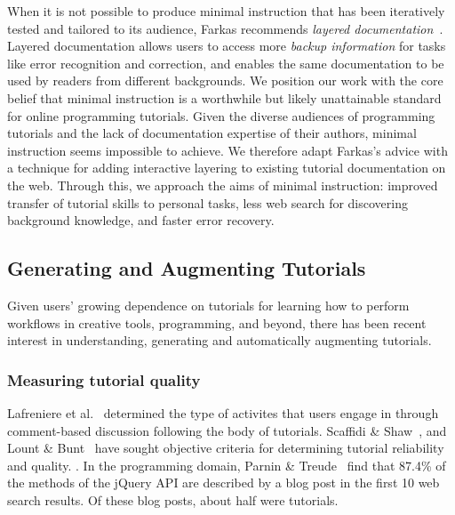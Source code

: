 When it is not possible to produce minimal instruction that has been iteratively tested and tailored to its audience, Farkas recommends \emph{layered documentation}~\cite{farkas_layering_1998}.
Layered documentation allows users to access more \emph{backup information} for tasks like error recognition and correction, and enables the same documentation to be used by readers from different backgrounds.
We position our work with the core belief that minimal instruction is a worthwhile but likely unattainable standard for online programming tutorials.
Given the diverse audiences of programming tutorials and the lack of documentation expertise of their authors, minimal instruction seems impossible to achieve.
We therefore adapt Farkas's advice with a technique for adding interactive layering to existing tutorial documentation on the web.
Through this, we approach the aims of minimal instruction: improved transfer of tutorial skills to personal tasks, less web search for discovering background knowledge, and faster error recovery.


\subsection{Generating and Augmenting Tutorials}

Given users' growing dependence on tutorials for learning how to perform workflows in creative tools, programming, and beyond, there has been recent interest in understanding, generating and automatically augmenting tutorials.

\subsubsection{Measuring tutorial quality}

Lafreniere et al.~\cite{lafreniere_understanding_2013} determined the type of activites that users engage in through comment-based discussion following the body of tutorials.
Scaffidi \& Shaw~\cite{scaffidi_toward_2007}, and Lount \& Bunt~\cite{lount_characterizing_2014} have sought objective criteria for determining tutorial reliability and quality.
.
In the programming domain, Parnin \& Treude~\cite{parnin_measuring_2011} find that 87.4\% of the methods of the jQuery API are described by a blog post in the first 10 web search results.
Of these blog posts, about half were tutorials.

